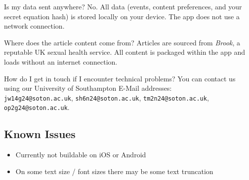 \documentclass[11pt,a4paper]{article}
\begin{document}
\begin{faqbox}{Is my data sent anywhere?}
No. All data (events, content preferences, and your secret equation hash)
is stored locally on your device. The app does not use a network connection.
\end{faqbox}

\begin{faqbox}{Where does the article content come from?}
Articles are sourced from
\emph{Brook},
a reputable UK sexual health service. All content is packaged within the app and
loads without an internet connection.
\end{faqbox}

\begin{faqbox}{How do I get in touch if I encounter technical problems?}
You can contact us using our University of Southampton E-Mail addresses:\\
\texttt{jw14g24@soton.ac.uk},\enspace
\texttt{sh6n24@soton.ac.uk},\enspace
\texttt{tm2n24@soton.ac.uk},\enspace
\texttt{op2g24@soton.ac.uk}.
\end{faqbox}

\subsection*{Known Issues}

\begin{knownbox}
\begin{itemize}[topsep=0pt]
      \item Currently not buildable on iOS or Android
      \item On some text size / font sizes there may be some text truncation
\end{itemize}
\end{knownbox}
\end{document}

